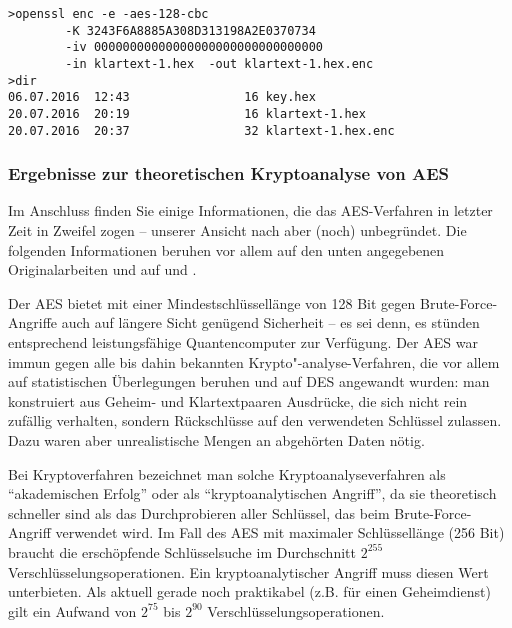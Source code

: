 \begin{lstlisting}
>openssl enc -e -aes-128-cbc
        -K 3243F6A8885A308D313198A2E0370734
        -iv 00000000000000000000000000000000
        -in klartext-1.hex  -out klartext-1.hex.enc
>dir
06.07.2016  12:43                16 key.hex
20.07.2016  20:19                16 klartext-1.hex
20.07.2016  20:37                32 klartext-1.hex.enc
\end{lstlisting}



\clearpage
\subsubsection{Ergebnisse zur theoretischen Kryptoanalyse von AES}
\label{cm_New-AES-Analysis}

Im Anschluss finden Sie einige Informationen, die das AES-Verfahren in
letzter Zeit in Zweifel zogen -- unserer Ansicht nach aber (noch)
unbegründet. Die folgenden Informationen beruhen vor allem auf den unten
angegebenen Originalarbeiten und auf \cite{Wobst2002} und
\cite{Lucks2002}.

Der AES bietet mit einer Mindestschlüssellänge von 128 Bit gegen
Brute-Force-Angriffe auch auf längere Sicht genügend Sicherheit -- es sei
denn, es stünden entsprechend leistungsfähige Quantencomputer zur
Verfügung. Der AES war immun gegen alle bis dahin bekannten
Krypto"-analyse-Verfahren, die vor allem auf statistischen
Überlegungen beruhen und auf DES angewandt wurden: man konstruiert aus
Geheim- und Klartextpaaren Ausdrücke, die sich nicht rein zufällig
verhalten, sondern Rückschlüsse auf den verwendeten Schlüssel zulassen.
Dazu waren aber unrealistische Mengen an abgehörten Daten nötig.

Bei Kryptoverfahren bezeichnet man solche Kryptoanalyseverfahren als
"`akademischen Erfolg"' oder als "`kryptoanalytischen Angriff"', da sie
theoretisch schneller sind als das Durchprobieren aller Schlüssel, das
beim Brute-Force-Angriff verwendet wird. Im
Fall des AES mit maximaler Schlüssellänge (256 Bit) braucht die
erschöpfende Schlüsselsuche im Durchschnitt $2^{255}$
Verschlüsselungsoperationen. Ein kryptoanalytischer Angriff muss diesen
Wert unterbieten. Als aktuell gerade noch praktikabel (z.B. für einen
Geheimdienst) gilt ein Aufwand von $2^{75}$ bis $2^{90}$
Verschlüsselungsoperationen.

